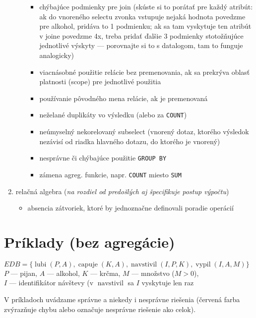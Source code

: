 \documentclass[10pt, a4paper]{article}
\theoremstyle{definition}
\DeclareMathOperator{\lubi}{lubi}
\DeclareMathOperator{\capuje}{capuje}
\DeclareMathOperator{\navstivil}{navstivil}
\DeclareMathOperator{\vypil}{vypil}
\begin{document}
\begin{enumerate}
\begin{itemize}
    \begin{itemize}
    \item chýbajúce podmienky pre join (skúste si to porátať pre každý atribút: ak do vnoreného selectu zvonka vstupuje nejaká hodnota povedzme pre alkohol, pridáva to 1 podmienku; ak sa tam vyskytuje ten atribút v joine povedzme 4x, treba pridať ďalšie 3 podmienky stotožňujúce jednotlivé výskyty --- porovnajte si to s datalogom, tam to funguje analogicky)
    \item viacnásobné použitie relácie bez premenovania, ak sa prekrýva oblasť platnosti (scope) pre jednotlivé použitia
    \item používanie pôvodného mena relácie, ak je premenovaná
    \item neželané duplikáty vo výsledku (alebo za \verb|COUNT|)
    \item neúmyselný nekorelovaný subselect (vnorený dotaz, ktorého výsledok nezávisí od riadka hlavného dotazu, do ktorého je vnorený)
    \item nesprávne či chýbajúce použitie \verb|GROUP BY|
    \item zámena agreg. funkcie, napr. \verb|COUNT| miesto \verb|SUM|
    \end{itemize}
\end{itemize}

\item relačná algebra (\emph{na rozdiel od predošlých aj špecifikuje postup výpočtu})
\begin{itemize}
\item absencia zátvoriek, ktoré by jednoznačne definovali poradie operácií
\end{itemize}
\end{enumerate}



\section{Príklady (bez agregácie)}

$EDB = \{\lubi(P, A), \capuje(K, A), \navstivil(I, P, K), \vypil(I, A, M)\}$\\[2mm]
$P$ --- pijan, $A$ --- alkohol, $K$ --- krčma, $M$ --- množstvo ($M > 0$),\\
$I$ --- identifikátor návštevy (v $\navstivil$ sa $I$ vyskytuje len raz

V príkladoch uvádzame správne a niekedy i nesprávne riešenia (červená farba zvýrazňuje chybu alebo označuje nesprávne riešenie ako celok).
\end{document}
